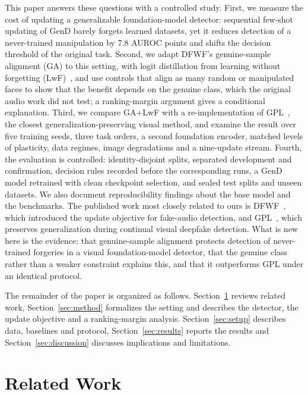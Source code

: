 \documentclass[journal]{IEEEtran}
\begin{document}
This paper answers these questions with a controlled study. First, we measure the cost of updating a generalizable foundation-model detector: sequential few-shot updating of GenD barely forgets learned datasets, yet it reduces detection of a never-trained manipulation by 7.8 AUROC points and shifts the decision threshold of the original task. Second, we adapt DFWF's genuine-sample alignment (GA) to this setting, with logit distillation from learning without forgetting (LwF)~\cite{li2018lwf}, and use controls that align as many random or manipulated faces to show that the benefit depends on the genuine class, which the original audio work did not test; a ranking-margin argument gives a conditional explanation. Third, we compare GA+LwF with a re-implementation of GPL~\cite{zhang2025gpl}, the closest generalization-preserving visual method, and examine the result over five training seeds, three task orders, a second foundation encoder, matched levels of plasticity, data regimes, image degradations and a nine-update stream. Fourth, the evaluation is controlled: identity-disjoint splits, separated development and confirmation, decision rules recorded before the corresponding runs, a GenD model retrained with clean checkpoint selection, and sealed test splits and unseen datasets. We also document reproducibility findings about the base model and the benchmarks. The published work most closely related to ours is DFWF~\cite{ma2021dfwf}, which introduced the update objective for fake-audio detection, and GPL~\cite{zhang2025gpl}, which preserves generalization during continual visual deepfake detection. What is new here is the evidence: that genuine-sample alignment protects detection of never-trained forgeries in a visual foundation-model detector, that the genuine class rather than a weaker constraint explains this, and that it outperforms GPL under an identical protocol.

The remainder of the paper is organized as follows. Section~\ref{sec:related} reviews related work, Section~\ref{sec:method} formalizes the setting and describes the detector, the update objective and a ranking-margin analysis. Section~\ref{sec:setup} describes data, baselines and protocol, Section~\ref{sec:results} reports the results and Section~\ref{sec:discussion} discusses implications and limitations.

\section{Related Work}
\label{sec:related}
\end{document}
